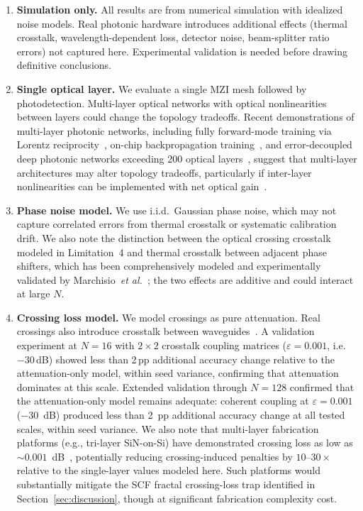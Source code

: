 \documentclass[11pt,a4paper]{article}
\begin{document}
\begin{enumerate}
  \item \textbf{Simulation only.}  All results are from numerical simulation with
        idealized noise models.  Real photonic hardware introduces additional effects
        (thermal crosstalk, wavelength-dependent loss, detector noise, beam-splitter
        ratio errors) not captured here.  Experimental validation is needed before
        drawing definitive conclusions.

  \item \textbf{Single optical layer.}  We evaluate a single MZI mesh followed by
        photodetection.  Multi-layer optical networks with optical nonlinearities
        between layers could change the topology tradeoffs.
        Recent demonstrations of multi-layer photonic networks, including fully
        forward-mode training via Lorentz reciprocity~\cite{xue2024}, on-chip
        backpropagation training~\cite{ashtiani2026}, and error-decoupled deep
        photonic networks exceeding 200 optical layers~\cite{zhou2025}, suggest
        that multi-layer architectures may alter topology tradeoffs, particularly
        if inter-layer nonlinearities can be implemented with net optical
        gain~\cite{slinkov2025}.

  \item \textbf{Phase noise model.}  We use i.i.d.\ Gaussian phase noise, which
        may not capture correlated errors from thermal crosstalk or systematic
        calibration drift.
        We also note the distinction between the optical crossing crosstalk
        modeled in Limitation~4 and thermal crosstalk between adjacent phase
        shifters, which has been comprehensively modeled and experimentally
        validated by Marchisio~\textit{et al.}~\cite{marchisio2025}; the two
        effects are additive and could interact at large $N$.

  \item \textbf{Crossing loss model.}  We model crossings as pure attenuation.
        Real crossings also introduce crosstalk between waveguides~\cite{shafiee2024}.
        A validation experiment at $N{=}16$ with $2 \times 2$ crosstalk coupling
        matrices ($\varepsilon = 0.001$, i.e.\ $-30$\,dB) showed less than 2\,pp
        additional accuracy change relative to the attenuation-only model, within
        seed variance, confirming that attenuation dominates at this scale.
        Extended validation through $N{=}128$ confirmed that the
        attenuation-only model remains adequate: coherent coupling at
        $\varepsilon = 0.001$ ($-30$~dB) produced less than 2~pp additional
        accuracy change at all tested scales, within seed variance.
        We also note that multi-layer fabrication platforms (e.g., tri-layer
        SiN-on-Si) have demonstrated crossing loss as low as
        ${\sim}0.001$~dB~\cite{sacher2017}, potentially reducing
        crossing-induced penalties by $10$--$30\times$ relative to the
        single-layer values modeled here.  Such platforms would substantially
        mitigate the SCF fractal crossing-loss trap identified in
        Section~\ref{sec:discussion}, though at significant fabrication
        complexity cost.


\end{enumerate}
\end{document}

